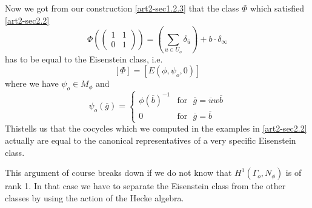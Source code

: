 Now we got from our construction \eqref{art2-sec1.2.3} that the class $\Phi$ which satisfied \eqref{art2-sec2.2}
$$
\Phi\left(\left(\begin{matrix} 1 & 1\\ 0 & 1\end{matrix}\right)\right)=\left(\sum\limits_{u\in U_{o}}\delta_{\overline{u}}\right)+b\cdot \delta_{\infty}
$$
has to be equal to the Eisenstein class, i.e.
$$
[\Phi]=[E(\phi,\psi_{o},0)]
$$
where we have $\psi_{o}\in M_{\phi}$ and 
$$
\psi_{o}(\overline{g})=
\begin{cases}
\phi(\overline{b})^{-1} & \text{for~ } \overline{g}=\overline{u}w\overline{b}\\[3pt]
0 & \text{for~ } \overline{g}=\overline{b}
\end{cases}
$$
This\pageoriginale tells us that the cocycles which we computed in the examples in \eqref{art2-sec2.2} actually are equal to the canonical representatives of a very specific Eisenstein class.

\begin{remark*}
This argument of course breaks down if we do not know that $H^{1}(\Gamma_{o},N_{\phi})$ is of rank 1. In that case we have to separate the Eisenstein class from the other classes by using the action of the Hecke algebra.
\end{remark*}

